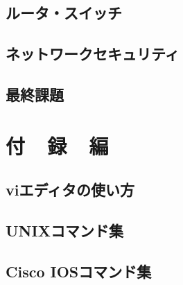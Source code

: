 \documentclass[10pt]{text2002}
\begin{document}
\chapter{ルータ・スイッチ}\label{ch:patch}
\def\chaprouter{03_1_router_sw/}

\def\chapsw{03_1_router_sw/}


\chapter{ネットワークセキュリティ}
\def\chapfw{03_2_firewall/}


\chapter{最終課題}
\def\chapfinal{07_final/}


%


\part{付~~録~~編}\label{part:appendix}
\appendix
\chapter{viエディタの使い方}\label{etc:vi}


\chapter{UNIXコマンド集}\label{etc:unixcmd}

%
%
%
\chapter{Cisco IOSコマンド集}\label{etc:ioscmd}


%

%

%
\end{document}
